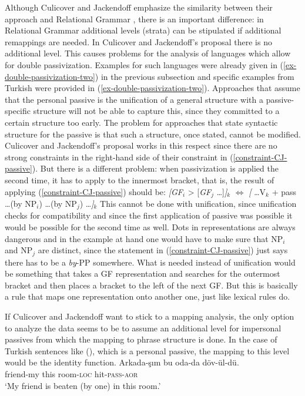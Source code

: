 \begin{exe}
\begin{xlist}[iv.]
\begin{exe}
\begin{xlist}[iv.]
Although Culicover and Jackendoff emphasize the similarity between their approach and Relational
Grammar \citep{Perlmutter83a-ed}, there is an important difference: in Relational Grammar additional levels (strata) can be stipulated
if additional remappings are needed. In Culicover and Jackendoff's proposal there is no additional
level. This causes problems for the analysis of languages which allow for double
passivization. Examples for such languages were already given in (\ref{ex-double-passivization-two}) in
the previous subsection and specific examples from Turkish were provided in
(\ref{ex-double-passivization-two}). Approaches that assume that the personal passive is the unification
of a general structure with a passive-specific structure will not be able to capture this, since they committed
to a certain structure too early. The problem for approaches that state syntactic structure for the
passive is that such a structure, once stated, cannot be modified. Culicover and Jackendoff's 
 proposal works in this respect since there are no strong constraints in the
right-hand side of their constraint in (\ref{constraint-CJ-passive}). But there is a different
problem: when passivization is applied the second time, it has to apply to the innermost bracket,
that is, the result of applying (\ref{constraint-CJ-passive}) should be:
\ea
{}\emph{[GF}$_i$ > [\emph{GF}$_j$ \ldots]\emph{]}$_k$ $\Leftrightarrow$ \emph{[} \ldots V$_k$ + pass \ldots (by NP$_i$) \ldots (by NP$_j$) \ldots\emph{]}$_k$
\z
This cannot be done with unification, since unification checks for compatibility and since the first
application of passive was possible it would be possible for the second time as well. Dots in
representations are always dangerous and in the example at hand one would have to make sure that
NP$_i$ and NP$_j$ are distinct, since the statement in (\ref{constraint-CJ-passive}) just says there
has to be a \emph{by}-PP somewhere. What is needed instead of unification would be something that takes a GF representation
and searches for the outermost bracket and then places a bracket to the left of the next GF. But
this is basically a rule that maps one representation onto another one, just like lexical rules do.

If Culicover and Jackendoff want to stick to a mapping analysis, the only option to analyze the data
seems to be to assume an additional level for impersonal passives from which the mapping to phrase
structure is done. In the case of Turkish sentences like (), which is a personal passive, the mapping
to this level would be the identity function.   
\ea
\gll Arkada-şım bu oda-da döv-ül-dü.\\
     friend-my  this   room-\textsc{loc} hit-\textsc{pass}-\textsc{aor}\\
\glt `My friend is beaten (by one) in this room.'
\z


\end{xlist}
\end{exe}
\end{xlist}
\end{exe}
